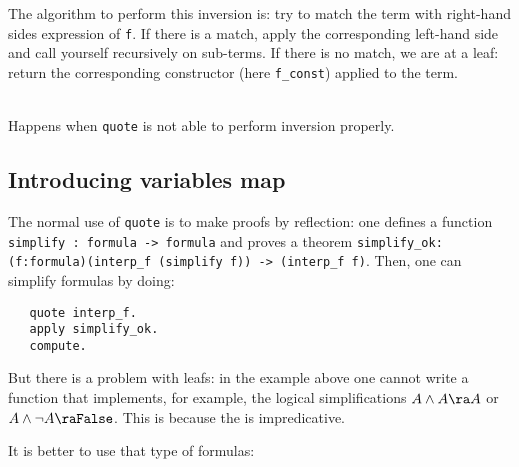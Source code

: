 The algorithm to perform this inversion is: try to match the
term with right-hand sides expression of \texttt{f}. If there is a
match, apply the corresponding left-hand side and call yourself
recursively on sub-terms. If there is no match, we are at a leaf:
return the corresponding constructor (here \texttt{f\_const}) applied
to the term. 

\begin{ErrMsgs}
\item {} \\
  Happens when \texttt{quote} is not able to perform inversion properly.
\end{ErrMsgs}

\subsection{Introducing variables map}

The normal use of \texttt{quote} is to make proofs by reflection: one
defines a function \texttt{simplify : formula -> formula} and proves a 
theorem \texttt{simplify\_ok: (f:formula)(interp\_f (simplify f)) ->
  (interp\_f f)}. Then, one can simplify formulas by doing:
\begin{verbatim}
   quote interp_f.
   apply simplify_ok.
   compute.
\end{verbatim}
But there is a problem with leafs: in the example above one cannot
write a function that implements, for example, the logical simplifications 
$A \land A \ra A$ or $A \land \lnot A \ra \texttt{False}$. This is
because the \Prop{} is impredicative.

It is better to use that type of formulas:

